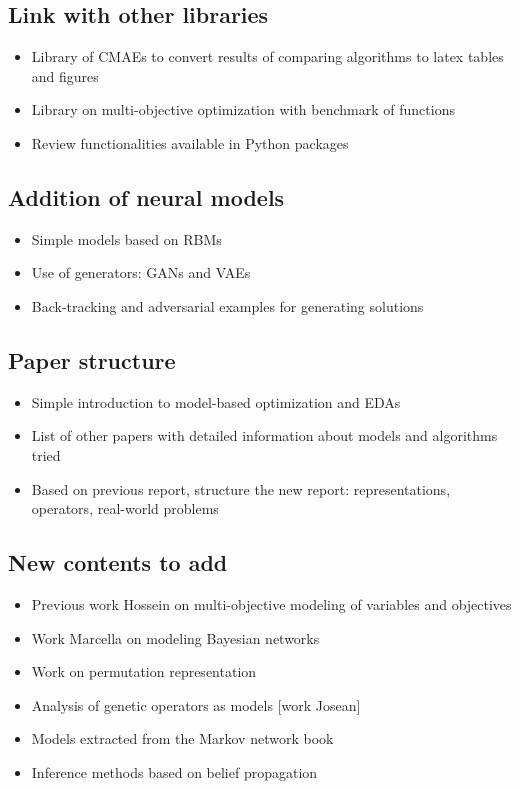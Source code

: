 \documentclass{article} %
\begin{document}
\subsection{Link with other libraries}
  \begin{itemize}
  \item Library of CMAEs to convert results of comparing algorithms to latex tables and figures
  \item Library on multi-objective optimization with benchmark of functions
  \item Review functionalities available in Python packages
\end{itemize}

\subsection{Addition of neural models}
  \begin{itemize}
  \item Simple models based on RBMs
  \item Use of generators: GANs and VAEs
  \item Back-tracking and adversarial examples for generating solutions
  \end{itemize}


\subsection{Paper structure}
  \begin{itemize}
   \item Simple introduction to model-based optimization and EDAs
   \item List of other papers with detailed information about models and algorithms tried
   \item Based on previous report, structure the new report: representations, operators, real-world problems
  \end{itemize}
  

\subsection{New contents to add}
  \begin{itemize}
  \item Previous work Hossein on multi-objective modeling of variables and objectives
  \item Work Marcella on modeling Bayesian networks
  \item Work on permutation representation
  \item Analysis of genetic operators as models [work Josean]
  \item Models extracted from the Markov network book
  \item Inference methods based on belief propagation 
 \end{itemize}
\end{document}
